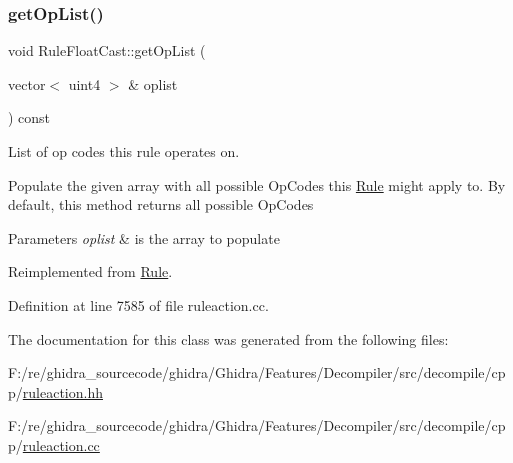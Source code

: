 \subsubsection{\texorpdfstring{getOpList()}{getOpList()}}
{\footnotesize\ttfamily void Rule\+Float\+Cast\+::get\+Op\+List (\begin{DoxyParamCaption}\item[{vector$<$ uint4 $>$ \&}]{oplist }\end{DoxyParamCaption}) const\hspace{0.3cm}{\ttfamily [virtual]}}



List of op codes this rule operates on. 

Populate the given array with all possible Op\+Codes this \mbox{\hyperlink{class_rule}{Rule}} might apply to. By default, this method returns all possible Op\+Codes 
\begin{DoxyParams}{Parameters}
{\em oplist} & is the array to populate \\
\hline
\end{DoxyParams}


Reimplemented from \mbox{\hyperlink{class_rule_a4023bfc7825de0ab866790551856d10e}{Rule}}.



Definition at line 7585 of file ruleaction.\+cc.



The documentation for this class was generated from the following files\+:\begin{DoxyCompactItemize}
\item 
F\+:/re/ghidra\+\_\+sourcecode/ghidra/\+Ghidra/\+Features/\+Decompiler/src/decompile/cpp/\mbox{\hyperlink{ruleaction_8hh}{ruleaction.\+hh}}\item 
F\+:/re/ghidra\+\_\+sourcecode/ghidra/\+Ghidra/\+Features/\+Decompiler/src/decompile/cpp/\mbox{\hyperlink{ruleaction_8cc}{ruleaction.\+cc}}\end{DoxyCompactItemize}
